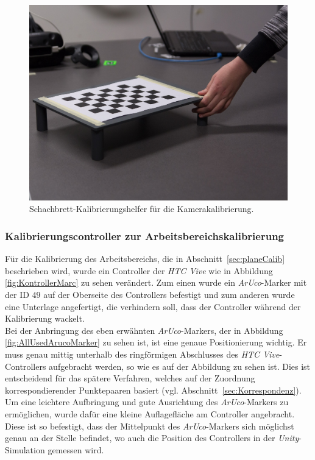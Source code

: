 	\begin{figure}[H] 
	\center 
	\includegraphics[trim = 0mm 20mm 30mm 40mm, clip]{Bilder/Eigene Fotos/IMG_0004.jpg}			
	\caption[Schachbrett-Kalibrierungshelfer für die Kamerakalibrierung]{Schachbrett-Kalibrierungshelfer für die Kamerakalibrierung.}
	\label{fig:schachbrettKalib}
\end{figure}

\subsubsection{Kalibrierungscontroller zur Arbeitsbereichskalibrierung} \label{sec:calibController} 
Für die Kalibrierung des Arbeitsbereichs, die in Abschnitt~\ref{sec:planeCalib} beschrieben wird, wurde ein Controller der \textit{HTC Vive} wie in Abbildung \ref{fig:KontrollerMarc} zu sehen verändert. Zum einen wurde ein \textit{ArUco}-Marker mit der ID $49$ auf der Oberseite des Controllers befestigt und zum anderen wurde eine Unterlage angefertigt, die verhindern soll, dass der Controller während der Kalibrierung wackelt.\\
Bei der Anbringung des eben erwähnten \textit{ArUco}-Markers, der in Abbildung \ref{fig:AllUsedArucoMarker} zu sehen ist, ist eine genaue Positionierung wichtig. Er muss genau mittig unterhalb des ringförmigen Abschlusses des \textit{HTC Vive}-Controllers aufgebracht werden, so wie es auf der Abbildung zu sehen ist. Dies ist entscheidend für das spätere Verfahren, welches auf der Zuordnung korrespondierender Punktepaaren basiert (vgl. Abschnitt~\ref{sec:Korrespondenz}). Um eine leichtere Aufbringung und gute Ausrichtung des \textit{ArUco}-Markers zu ermöglichen, wurde dafür eine kleine Auflagefläche am Controller angebracht. Diese ist so befestigt, dass der Mittelpunkt des \textit{ArUco}-Markers sich möglichst genau an der Stelle befindet, wo auch die Position des Controllers in der \emph{Unity}-Simulation gemessen wird.

